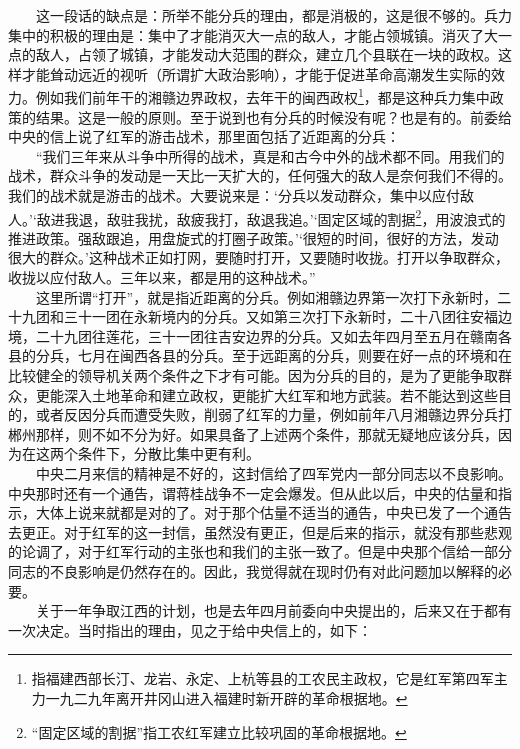 \documentclass[cn,11pt,chinese]{elegantbook}
\begin{document}
　　这一段话的缺点是：所举不能分兵的理由，都是消极的，这是很不够的。兵力集中的积极的理由是：集中了才能消灭大一点的敌人，才能占领城镇。消灭了大一点的敌人，占领了城镇，才能发动大范围的群众，建立几个县联在一块的政权。这样才能耸动远近的视听（所谓扩大政治影响），才能于促进革命高潮发生实际的效力。例如我们前年干的湘赣边界政权，去年干的闽西政权\footnote[12]{ 指福建西部长汀、龙岩、永定、上杭等县的工农民主政权，它是红军第四军主力一九二九年离开井冈山进入福建时新开辟的革命根据地。}，都是这种兵力集中政策的结果。这是一般的原则。至于说到也有分兵的时候没有呢？也是有的。前委给中央的信上说了红军的游击战术，那里面包括了近距离的分兵：\\
　　“我们三年来从斗争中所得的战术，真是和古今中外的战术都不同。用我们的战术，群众斗争的发动是一天比一天扩大的，任何强大的敌人是奈何我们不得的。我们的战术就是游击的战术。大要说来是：‘分兵以发动群众，集中以应付敌人。’‘敌进我退，敌驻我扰，敌疲我打，敌退我追。’‘固定区域的割据\footnote[13]{ “固定区域的割据”指工农红军建立比较巩固的革命根据地。}，用波浪式的推进政策。强敌跟追，用盘旋式的打圈子政策。’‘很短的时间，很好的方法，发动很大的群众。’这种战术正如打网，要随时打开，又要随时收拢。打开以争取群众，收拢以应付敌人。三年以来，都是用的这种战术。”\\
　　这里所谓“打开”，就是指近距离的分兵。例如湘赣边界第一次打下永新时，二十九团和三十一团在永新境内的分兵。又如第三次打下永新时，二十八团往安福边境，二十九团往莲花，三十一团往吉安边界的分兵。又如去年四月至五月在赣南各县的分兵，七月在闽西各县的分兵。至于远距离的分兵，则要在好一点的环境和在比较健全的领导机关两个条件之下才有可能。因为分兵的目的，是为了更能争取群众，更能深入土地革命和建立政权，更能扩大红军和地方武装。若不能达到这些目的，或者反因分兵而遭受失败，削弱了红军的力量，例如前年八月湘赣边界分兵打郴州那样，则不如不分为好。如果具备了上述两个条件，那就无疑地应该分兵，因为在这两个条件下，分散比集中更有利。\\
　　中央二月来信的精神是不好的，这封信给了四军党内一部分同志以不良影响。中央那时还有一个通告，谓蒋桂战争不一定会爆发。但从此以后，中央的估量和指示，大体上说来就都是对的了。对于那个估量不适当的通告，中央已发了一个通告去更正。对于红军的这一封信，虽然没有更正，但是后来的指示，就没有那些悲观的论调了，对于红军行动的主张也和我们的主张一致了。但是中央那个信给一部分同志的不良影响是仍然存在的。因此，我觉得就在现时仍有对此问题加以解释的必要。\\
　　关于一年争取江西的计划，也是去年四月前委向中央提出的，后来又在于都有一次决定。当时指出的理由，见之于给中央信上的，如下：\\
\end{document}
